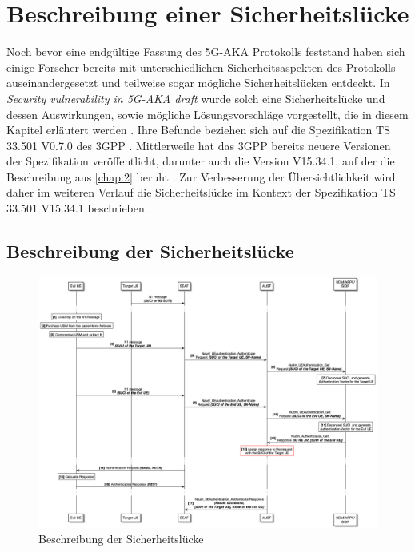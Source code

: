 \chapter{Beschreibung einer Sicherheitsl\"ucke}
\label{chap:4}

Noch bevor eine endgültige Fassung des 5G-AKA Protokolls feststand haben sich einige Forscher bereits mit unterschiedlichen Sicherheitsaspekten des Protokolls auseinandergesetzt und teilweise sogar mögliche Sicherheitslücken entdeckt.
In \textit{Security vulnerability in 5G-AKA draft} wurde solch eine Sicherheitslücke und dessen Auswirkungen, sowie mögliche Lösungsvorschläge vorgestellt, die in diesem Kapitel erläutert werden \cite{vulnerability}.
Ihre Befunde beziehen sich auf die Spezifikation TS 33.501 V0.7.0 des 3GPP \cite{3gppTS33.501V0.7.0}.
Mittlerweile hat das 3GPP bereits neuere Versionen der Spezifikation veröffentlicht, darunter auch die Version V15.34.1, auf der die Beschreibung aus \cref{chap:2} beruht \cite{3gppTS33.501V15.34.1}.
Zur Verbesserung der Übersichtlichkeit wird daher im weiteren Verlauf die Sicherheitslücke im Kontext der Spezifikation TS 33.501 V15.34.1 beschrieben.


\section{Beschreibung der Sicherheitslücke}

\begin{figure}[H]
  \centering
  \includegraphics[width=\textwidth]{uml/vulnerability_v1.png}
  \caption{Beschreibung der Sicherheitslücke}
  \label{fig:vulnerability_v1}
\end{figure}

